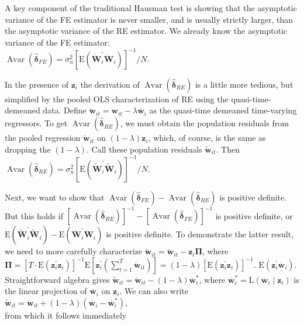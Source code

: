 \documentclass[10pt]{article}
\begin{document}
A key component of the traditional Hausman test is showing that the asymptotic variance of the FE estimator is never smaller, and is usually strictly larger, than the asymptotic variance of the RE estimator. We already know the asymptotic variance of the FE estimator:\\
$\operatorname{Avar}\left(\hat{\boldsymbol{\delta}}_{F E}\right)=\sigma_{u}^{2}\left[\mathrm{E}\left(\ddot{\mathbf{W}}_{i}^{\prime} \ddot{\mathbf{W}}_{i}\right)\right]^{-1} / N$.

In the presence of $\mathbf{z}_{i}$ the derivation of $\operatorname{Avar}\left(\hat{\boldsymbol{\delta}}_{R E}\right)$ is a little more tedious, but simplified by the pooled OLS characterization of RE using the quasi-time-demeaned data. Define $\breve{\mathbf{w}}_{i t}=\mathbf{w}_{i t}-\lambda \overline{\mathbf{w}}_{i}$ as the quasi-time demeaned time-varying regressors. To get $\operatorname{Avar}\left(\hat{\boldsymbol{\delta}}_{R E}\right)$, we must obtain the population residuals from the pooled regression $\breve{\mathbf{w}}_{i t}$ on $(1-\lambda) \mathbf{z}_{i}$, which, of course, is the same as dropping the $(1-\lambda)$. Call these population residuals $\tilde{\mathbf{w}}_{i t}$. Then\\
$\operatorname{Avar}\left(\hat{\boldsymbol{\delta}}_{R E}\right)=\sigma_{u}^{2}\left[\mathrm{E}\left(\tilde{\mathbf{W}}_{i}^{\prime} \tilde{\mathbf{W}}_{i}\right)\right]^{-1} / N$.

Next, we want to show that $\operatorname{Avar}\left(\hat{\boldsymbol{\delta}}_{F E}\right)-\operatorname{Avar}\left(\hat{\boldsymbol{\delta}}_{R E}\right)$ is positive definite. But this holds if $\left[\operatorname{Avar}\left(\hat{\boldsymbol{\delta}}_{R E}\right)\right]^{-1}-\left[\operatorname{Avar}\left(\hat{\boldsymbol{\delta}}_{F E}\right)\right]^{-1}$ is positive definite, or $\mathrm{E}\left(\tilde{\mathbf{W}}_{i}^{\prime} \tilde{\mathbf{W}}_{i}\right)-\mathrm{E}\left(\ddot{\mathbf{W}}_{i}^{\prime} \ddot{\mathbf{W}}_{i}\right)$ is positive definite. To demonstrate the latter result, we need to more carefully characterize $\tilde{\mathbf{w}}_{i t}=\breve{\mathbf{w}}_{i t}-\mathbf{z}_{i} \boldsymbol{\Pi}$, where $\boldsymbol{\Pi}=\left[T \cdot \mathrm{E}\left(\mathbf{z}_{i}^{\prime} \mathbf{z}_{i}\right)\right]^{-1} \mathrm{E}\left[\mathbf{z}_{i}^{\prime}\left(\sum_{t=1}^{T} \breve{\mathbf{w}}_{i t}\right)\right]=(1-\lambda)\left[\mathrm{E}\left(\mathbf{z}_{i}^{\prime} \mathbf{z}_{i}\right)\right]^{-1}$. $\mathrm{E}\left(\mathbf{z}_{i}^{\prime} \overline{\mathbf{w}}_{i}\right)$. Straightforward algebra gives $\tilde{\mathbf{w}}_{i t}=\breve{\mathbf{w}}_{i t}-(1-\lambda) \overline{\mathbf{w}}_{i}^{*}$, where $\overline{\mathbf{w}}_{i}^{*}=\mathrm{L}\left(\overline{\mathbf{w}}_{i} \mid \mathbf{z}_{i}\right)$ is the linear projection of $\overline{\mathbf{w}}_{i}$ on $\mathbf{z}_{i}$. We can also write\\
$\tilde{\mathbf{w}}_{i t}=\ddot{\mathbf{w}}_{i t}+(1-\lambda)\left(\overline{\mathbf{w}}_{i}-\overline{\mathbf{w}}_{i}^{*}\right)$,\\
from which it follows immediately
\end{document}
